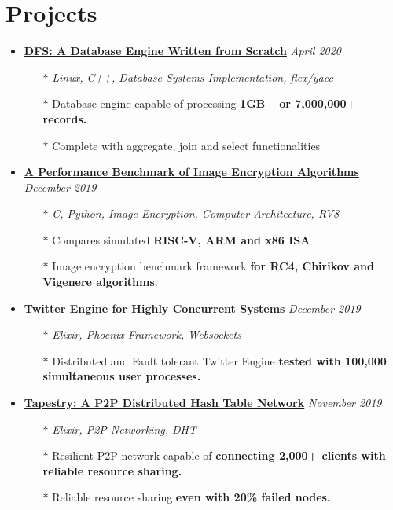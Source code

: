 \documentclass[10pt,a4paper]{article}
\begin{document}
\section{{\faCoffee} Projects}
	\begin{itemize}[noitemsep,nolistsep]

		\item{\textbf{\href{https://github.com/r0ck3r008/database-from-scratch}{DFS: A Database Engine Written from Scratch}} \hfill \textit{April 2020}}
			\begin{itemize}[leftmargin=*]
				\setlength\itemsep{-0.25em}
				\item[$\ast$]\textit{Linux, C++, Database Systems Implementation, flex/yacc}
				\item[$\ast$]Database engine capable of processing \textbf{1GB+ or 7,000,000+ records.}
				\item[$\ast$]Complete with aggregate, join and select functionalities
			\end{itemize}

		\item{\textbf{\href{https://github.com/r0ck3r008/arch-perf-benchmark}{A Performance Benchmark of Image Encryption Algorithms}} \hfill \textit{December 2019}}
			\begin{itemize}[leftmargin=*]
				\setlength\itemsep{-0.25em}
				\item[$\ast$]\textit{C, Python, Image Encryption, Computer Architecture, RV8}
				\item[$\ast$]Compares simulated \textbf{RISC-V, ARM and x86 ISA}
				\item[$\ast$]Image encryption benchmark framework \textbf{for RC4, Chirikov and Vigenere algorithms}.
			\end{itemize}

		\item{\textbf{\href{https://github.com/r0ck3r008/twitter-engine}{Twitter Engine for Highly Concurrent Systems}} \hfill \textit{December 2019}}
			\begin{itemize}[leftmargin=*]
				\setlength\itemsep{-0.25em}
				\item[$\ast$]\textit{Elixir, Phoenix Framework, Websockets}
				\item[$\ast$]Distributed and Fault tolerant Twitter Engine \textbf{tested with 100,000 simultaneous user processes.}
			\end{itemize}

		\item{\textbf{\href{https://github.com/r0ck3r008/tapestry\_p2p}{Tapestry: A P2P Distributed Hash Table Network}} \hfill \textit{November 2019}}
			\begin{itemize}[leftmargin=*]
				\setlength\itemsep{-0.25em}
				\item[$\ast$]\textit{Elixir, P2P Networking, DHT}
				\item[$\ast$]Resilient P2P network capable of \textbf{connecting 2,000+ clients with reliable resource sharing.}
				\item[$\ast$]Reliable resource sharing \textbf{even with 20\% failed nodes.}
			\end{itemize}

	\end{itemize}
\end{document}
